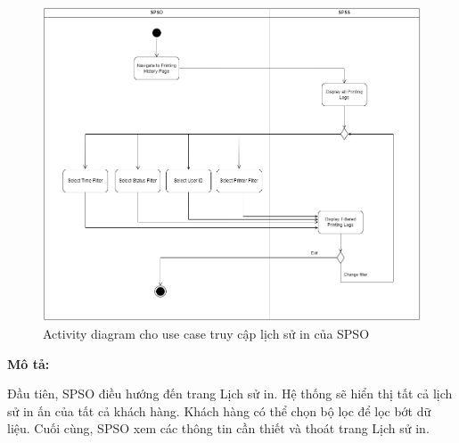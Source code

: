 \begin{figure}[H]
    \begin{center}
        \includegraphics[width=1\textwidth]{Images/System Modelling/Logging(SPSO)_Activity.png}
        \caption{Activity diagram cho use case truy cập lịch sử in của SPSO}
        \label{fig:arch}
    \end{center}
\end{figure}

\textbf{Mô tả:}\par
Đầu tiên, SPSO điều hướng đến trang Lịch sử in. Hệ thống sẽ hiển thị tất cả lịch sử in ấn của tất cả khách hàng. Khách hàng có thể chọn bộ lọc để lọc bớt dữ liệu. Cuối cùng, SPSO xem các thông tin cần thiết và thoát trang Lịch sử in.
